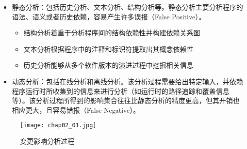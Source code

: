	\begin{itemize}
	
	\item 静态分析：包括历史分析、文本分析、结构分析等\cite{sun2012comparative,kagdi2007survey}。静态分析主要分析程序的语法、语义或者历史依赖，容易产生许多误报（False Positive）。
		\begin{itemize}
		\item 结构分析着重于分析程序间的结构依赖性并构建依赖关系图
		\item 文本分析根据程序中的注释和标识符提取出其概念依赖性
		\item 历史分析能够从多个软件版本的演进过程中挖掘相关信息
		\end{itemize}
	
	\item 动态分析：包括在线分析和离线分析。该分析过程需要给出特定输入，并依赖程序运行时所收集到的信息来进行分析（如运行时的路径追踪和覆盖信息等）\cite{law2003whole}。该分析过程所得到的影响集合往往比静态分析的精度更高，但其开销也相应更大，且容易错报（False Negative）。
		

		
	\end{itemize}

\begin{figure}[H]
	\centering
	\texttt{[image: chap02\_01.jpg]}
	\caption {变更影响分析过程}
	\label {变更影响分析process} 
\end{figure}

